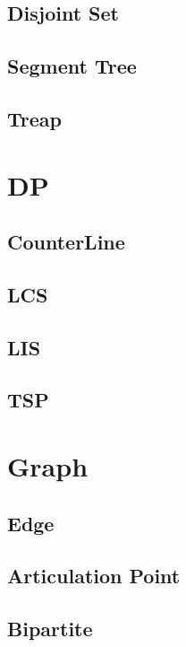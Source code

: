 \subsection{Disjoint Set}

\subsection{Segment Tree}

\subsection{Treap}



\section{DP}

\subsection{CounterLine}

\subsection{LCS}

\subsection{LIS}

\subsection{TSP}


\section{Graph}
\subsection{Edge}

\subsection{Articulation Point}

\subsection{Bipartite}

